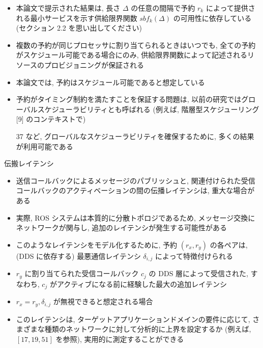 \begin{frame}{}
    \begin{itemize}
        \item 本論文で提示された結果は, 長さ $\Delta$ の任意の間隔で予約 $r_{k}$ によって提供される最小サービスを示す供給限界関数 $s b f_{k}(\Delta)$ の可用性に依存している (セクション 2.2 を思い出してください)
\item 複数の予約が同じプロセッサに割り当てられるときはいつでも, 全ての予約がスケジュール可能である場合にのみ, 供給限界関数によって記述されるリソースのプロビジョニングが保証される
\item 本論文では, 予約はスケジュール可能であると想定している
\item 予約がタイミング制約を満たすことを保証する問題は, 以前の研究ではグローバルスケジューラビリティとも呼ばれる (例えば, 階層型スケジューリング [9] のコンテキストで)
\item [37] など, グローバルなスケジューラビリティを確保するために, 多くの結果が利用可能である
    \end{itemize}
\end{frame}

\begin{frame}{伝搬レイテンシ}
    \begin{itemize}
        \item 送信コールバックによるメッセージのパブリッシュと, 関連付けられた受信コールバックのアクティベーションの間の伝播レイテンシは, 重大な場合がある
\item 実際, ROS システムは本質的に分散トポロジであるため, メッセージ交換にネットワークが関与し, 追加のレイテンシが発生する可能性がある
\item このようなレイテンシをモデル化するために, 予約 $\left(r_{x}, r_{y}\right)$ の各ペアは, (DDS に依存する) 最悪通信レイテンシ $\delta_{i, j}$ によって特徴付けられる
\item $r_{y}$ に割り当てられた受信コールバック $c_{j}$ の DDS 層によって受信された, すなわち, $c_{j}$ がアクティブになる前に経験した最大の追加レイテンシ
\item $r_{x}=r_{y}, \delta_{i, j}$ が無視できると想定される場合
\item このレイテンシは, ターゲットアプリケーションドメインの要件に応じて, さまざまな種類のネットワークに対して分析的に上界を設定するか (例えば,  $[17,19,51]$ を参照), 実用的に測定することができる
    \end{itemize}
\end{frame}

